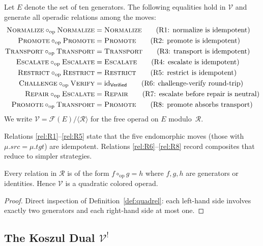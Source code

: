 \documentclass[11pt]{article}
\newcommand{\Vop}{\mathcal{V}}           %
\newcommand{\Kd}{\mathcal{V}^{!}}        %
\newcommand{\Fop}{\mathcal{F}}           %
\newcommand{\opcomp}{\circ_{\mathrm{op}}}%
\newcommand{\quadrel}{\mathcal{R}}       %
\newcommand{\verifCol}{\mathsf{Verified}} %
\begin{document}
\begin{definition}[Quadratic relations $\quadrel$]\label{def:quadrel}
Let $E$ denote the set of ten generators.  The following equalities hold
in $\Vop$ and generate all operadic relations among the moves:
\begin{align}
  \NORMALIZE \opcomp \NORMALIZE &= \NORMALIZE
    \tag{R1: normalize is idempotent}\label{rel:R1}\\
  \PROMOTE \opcomp \PROMOTE &= \PROMOTE
    \tag{R2: promote is idempotent}\label{rel:R2}\\
  \TRANSPORT \opcomp \TRANSPORT &= \TRANSPORT
    \tag{R3: transport is idempotent}\label{rel:R3}\\
  \ESCALATE \opcomp \ESCALATE &= \ESCALATE
    \tag{R4: escalate is idempotent}\label{rel:R4}\\
  \RESTRICT \opcomp \RESTRICT &= \RESTRICT
    \tag{R5: restrict is idempotent}\label{rel:R5}\\
  \CHALLENGE \opcomp \VERIFY &= \mathrm{id}_{\verifCol}
    \tag{R6: challenge-verify round-trip}\label{rel:R6}\\
  \REPAIR \opcomp \ESCALATE &= \REPAIR
    \tag{R7: escalate before repair is neutral}\label{rel:R7}\\
  \PROMOTE \opcomp \TRANSPORT &= \PROMOTE
    \tag{R8: promote absorbs transport}\label{rel:R8}
\end{align}
We write $\Vop = \Fop(E)/\langle \quadrel \rangle$ for the free operad
on $E$ modulo~$\quadrel$.
\end{definition}

Relations \eqref{rel:R1}--\eqref{rel:R5} state that the five
endomorphic moves (those with $\mu.\mathit{src} = \mu.\mathit{tgt}$)
are idempotent.
Relations \eqref{rel:R6}--\eqref{rel:R8} record composites that reduce
to simpler strategies.

\begin{lemma}\label{lem:quadratic}
Every relation in $\quadrel$ is of the form $f \opcomp g = h$ where
$f, g, h$ are generators or identities.
Hence $\Vop$ is a quadratic colored operad.
\end{lemma}

\begin{proof}
Direct inspection of Definition~\ref{def:quadrel}: each left-hand side
involves exactly two generators and each right-hand side at most one.
\end{proof}

\subsection{The Koszul Dual $\Kd$}
\end{document}
